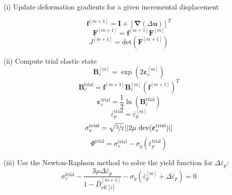 \documentclass[sn-mathphys,Numbered]{sn-jnl}%
\newcommand{\bb}{\boldsymbol}
\begin{document}
\begin{algorithm}[htbp] \label{alg:lemaitre} \footnotesize
\SetAlgoLined
(i) Update deformation gradients for a given incremental displacement

\begin{equation}
  \bb{f}^{[m+1]} = \bb{I} + \left[ \bb{\nabla}(\Delta\textbf{u}) \right]^T \nonumber
\end{equation}
\begin{equation}
  \bb{F}^{[m+1]} = \bb{f}^{[m+1]} \bb{F}^{[m]}  \nonumber
\end{equation}
\begin{equation}
  J^{[m+1]} = \text{det} \left( \bb{F}^{[m+1]} \right) \nonumber
\end{equation}

(ii) Compute trial elastic state
\begin{equation}
\bb{B}_{e}^{[m]} = \exp\left({2\boldsymbol{\varepsilon}_{e}^{[m]}}\right) \nonumber
\end{equation}
\begin{equation}
\bb{B}_{e}^{\text{trial}} = \bb{f}^{[m+1]}  \bb{B}_{e}^{[m]}  \left(\bb{f}^{[m+1]}\right)^{T}\nonumber
\end{equation}
\begin{equation}
\boldsymbol{\varepsilon}_{e}^{\text{trial}} = \frac{1}{2} \ln(\textbf{B}_{e}^{\text{trial}}) \nonumber
\end{equation}
\begin{equation}
\bar{\varepsilon}^{\text{trial}}_p = \bar{\varepsilon}^{[m]}_p \nonumber
\end{equation}
\begin{equation}
\sigma_{v}^{\text{trial}} = \sqrt{\sfrac{3}{2}} \, || 2\mu\ \text{dev}(\boldsymbol{\varepsilon}_{e}^{\text{trial}})|| \nonumber
\end{equation}
\begin{equation}
\Phi^{\text{trial}} =  \sigma_{v}^{\text{trial}} - \sigma_{y}(\bar{\varepsilon}^{\text{trial}}_p) \nonumber 
\end{equation}

(iii) Use the Newton-Raphson method to solve the yield function for $\Delta\bar{\varepsilon}_p$:
\begin{equation}
	\sigma_{v}^{\text{trial}} 
	- \frac{ 3\mu \Delta\bar{\varepsilon}_p }{1 - \bar{D}^{[m+1]}_{\text{eff}\,[i]}}
	-\sigma_{y}(\bar{\varepsilon}^{[m]}_p + \Delta\bar{\varepsilon}_p) = 0 \nonumber
\end{equation}


\end{algorithm}
\end{document}
